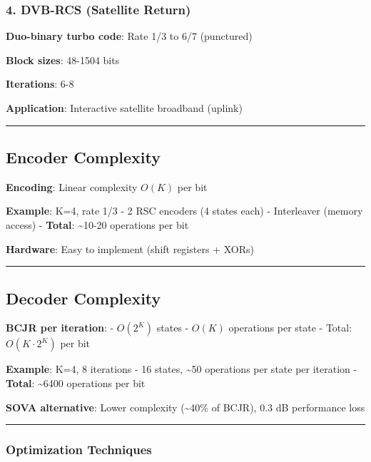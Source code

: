 \subsubsection{4. DVB-RCS (Satellite
Return)}\label{dvb-rcs-satellite-return}

\textbf{Duo-binary turbo code}: Rate 1/3 to 6/7 (punctured)

\textbf{Block sizes}: 48-1504 bits

\textbf{Iterations}: 6-8

\textbf{Application}: Interactive satellite broadband (uplink)

\begin{center}\rule{0.5\linewidth}{0.5pt}\end{center}

\subsection{Encoder Complexity}\label{encoder-complexity}

\textbf{Encoding}: Linear complexity \(O(K)\) per bit

\textbf{Example}: K=4, rate 1/3 - 2 RSC encoders (4 states each) -
Interleaver (memory access) - \textbf{Total}: \textasciitilde10-20
operations per bit

\textbf{Hardware}: Easy to implement (shift registers + XORs)

\begin{center}\rule{0.5\linewidth}{0.5pt}\end{center}

\subsection{Decoder Complexity}\label{decoder-complexity}

\textbf{BCJR per iteration}: - \(O(2^K)\) states - \(O(K)\) operations
per state - Total: \(O(K \cdot 2^K)\) per bit

\textbf{Example}: K=4, 8 iterations - 16 states, \textasciitilde50
operations per state per iteration - \textbf{Total}: \textasciitilde6400
operations per bit

\textbf{SOVA alternative}: Lower complexity (\textasciitilde40\% of
BCJR), 0.3 dB performance loss

\begin{center}\rule{0.5\linewidth}{0.5pt}\end{center}

\subsubsection{Optimization Techniques}\label{optimization-techniques}

